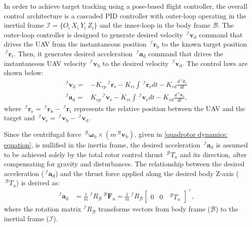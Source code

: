 \iffalse
In order to achieve target tracking using a pose-based flight controller, the overall control architecture is a cascaded PID controller with outer-loop operating in the inertial frame $\mathcal{I}=\{O_{\text{i}} ~X_{\text{i}} ~Y_{\text{i}} ~Z_{\text{i}}\}$ and the inner-loop in the body frame $\mathcal{B}$.
The outer-loop controller is designed to generate desired velocity $\,^\mathcal{I}\boldsymbol{v}_{\text{d}}$ command that drives the UAV from the instantaneous position $\,^\mathcal{I} \boldsymbol{r}_{\text{b}}$ to the known target position $\,^\mathcal{I}\boldsymbol{r}_{\text{t}}$.
Then, it generates desired acceleration $\,^\mathcal{I}\boldsymbol{a}_{\text{d}}$ command that drives the instantaneous UAV velocity $\,^\mathcal{I} \boldsymbol{v}_{\text{b}}$ to the desired velocity $\,^\mathcal{I}\boldsymbol{v}_{\text{d}}$.
The control laws are shown below:
\begin{align} \label{outer_loop_control: equation}
    \,^\mathcal{I}\boldsymbol{v}_{\text{d}} =& - K_{rp} \,^\mathcal{I}\boldsymbol{r}_{\text{e}} - K_{ri} \int \,^\mathcal{I}\boldsymbol{r}_{\text{e}} dt - K_{rd} \frac{d\,^\mathcal{I}\boldsymbol{r}_{\text{e}}}{dt} \nonumber \\
    \,^\mathcal{I}\boldsymbol{a}_{\text{d}} =&  K_{vp} \,^\mathcal{I}\boldsymbol{v}_{\text{e}} - K_{vi} \int \,^\mathcal{I}\boldsymbol{v}_{\text{e}} dt - K_{vd} \frac{d\,^\mathcal{I}\boldsymbol{v}_{\text{e}}}{dt},
\end{align}
where $\,^\mathcal{I}\boldsymbol{r}_{\text{e}} = \,^\mathcal{I}\boldsymbol{r}_{\text{b}} - \,^\mathcal{I}\boldsymbol{r}_{\text{t}}$ represents the relative position between the UAV and the target and $\,^\mathcal{I}\boldsymbol{v}_{\text{e}} = \,^\mathcal{I}\boldsymbol{v}_{\text{b}} - \,^\mathcal{I}\boldsymbol{v}_{\text{d}}$.

Since the centrifugal force $\,^\mathcal{B} \boldsymbol{\omega}_{\text{b}} \times (m \,^\mathcal{B} \boldsymbol{v}_{\text{b}})$, given in \eqref{quadrotor dynamics: equation}, is nullified in the inertia frame, the desired acceleration $\,^\mathcal{I}\boldsymbol{a}_{\text{d}}$ is assumed to be achieved solely by the total rotor control thrust $\,^\mathcal{B} T_u$ and its direction, after compensating for gravity and disturbances.
The relationship between the desired acceleration ($\,^\mathcal{I}\boldsymbol{a}_{\text{d}}$) and the thrust force applied along the desired body Z-axis ($\,^\mathcal{B} T_u$) is derived as:
\begin{align} \label{a_des: equation}
    \,^\mathcal{I} \boldsymbol{a}_{\text{d}} &= \frac{1}{m} \,^\mathcal{I}R_{\mathcal{B}} \,^\mathcal{B} \boldsymbol{F}_u = \frac{1}{m} \,^\mathcal{I}R_{\mathcal{B}} \begin{bmatrix} 0 & 0 & \,^\mathcal{B} T_u \end{bmatrix}^\top,
\end{align}
where the rotation matrix $^\mathcal{I}R_\mathcal{B}$ transforms vectors from body frame ($\mathcal{B}$) to the inertial frame ($\mathcal{I}$).

